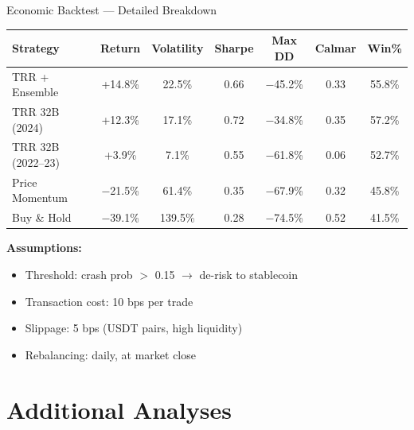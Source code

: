 \documentclass[10pt,aspectratio=169]{beamer}
\begin{document}
\begin{frame}{Economic Backtest — Detailed Breakdown}
  \begin{table}
    \centering
    \small
    \begin{tabular}{lcccccc}
      \toprule
      \textbf{Strategy} & \textbf{Return} & \textbf{Volatility} & \textbf{Sharpe} & \textbf{Max DD} & \textbf{Calmar} & \textbf{Win\%} \\
      \midrule
      \rowcolor{green!10}
      TRR + Ensemble & +14.8\% & 22.5\% & 0.66 & $-$45.2\% & 0.33 & 55.8\% \\
      TRR 32B (2024) & +12.3\% & 17.1\% & 0.72 & $-$34.8\% & 0.35 & 57.2\% \\
      TRR 32B (2022--23) & +3.9\% & 7.1\% & 0.55 & $-$61.8\% & 0.06 & 52.7\% \\
      Price Momentum & $-$21.5\% & 61.4\% & 0.35 & $-$67.9\% & 0.32 & 45.8\% \\
      \rowcolor{red!5}
      Buy \& Hold & $-$39.1\% & 139.5\% & 0.28 & $-$74.5\% & 0.52 & 41.5\% \\
      \bottomrule
    \end{tabular}
  \end{table}
  
  \textbf{Assumptions:}
  \begin{itemize}
    \item Threshold: crash prob $>$ 0.15 $\to$ de-risk to stablecoin
    \item Transaction cost: 10 bps per trade
    \item Slippage: 5 bps (USDT pairs, high liquidity)
    \item Rebalancing: daily, at market close
  \end{itemize}
\end{frame}

\section{Additional Analyses}
\end{document}
